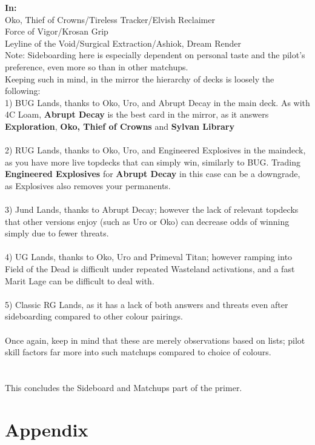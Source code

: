 \documentclass{report}
\begin{document}
\textbf{In:}\\
Oko, Thief of Crowns/Tireless Tracker/Elvish Reclaimer\\Force of Vigor/Krosan Grip\\Leyline of the Void/Surgical Extraction/Ashiok, Dream Render\\
Note: Sideboarding here is especially dependent on personal taste and the pilot's preference, even more so than in other matchups.\\
Keeping such in mind, in the mirror the hierarchy of decks is loosely the following:\\
1) BUG Lands, thanks to Oko, Uro, and Abrupt Decay in the main deck. As with 4C Loam, \textbf{Abrupt Decay} is the best card in the mirror, as it answers \textbf{Exploration}, \textbf{Oko, Thief of Crowns} and \textbf{Sylvan Library}\\\\
2) RUG Lands, thanks to Oko, Uro, and Engineered Explosives in the maindeck, as you have more live topdecks that can simply win, similarly to BUG. Trading \textbf{Engineered Explosives} for \textbf{Abrupt Decay} in this case can be a downgrade, as Explosives also removes your permanents.\\\\
3) Jund Lands, thanks to Abrupt Decay; however the lack of relevant topdecks that other versions enjoy (such as Uro or Oko) can decrease odds of winning simply due to fewer threats.\\\\
4) UG Lands, thanks to Oko, Uro and Primeval Titan; however ramping into Field of the Dead is difficult under repeated Wasteland activations, and a fast Marit Lage can be difficult to deal with.\\\\
5) Classic RG Lands, as it has a lack of both answers and threats even after sideboarding compared to other colour pairings. \\\\
Once again, keep in mind that these are merely observations based on lists; pilot skill factors far more into such matchups compared to choice of colours.\\\\\\
This concludes the Sideboard and Matchups part of the primer.\\
\chapter{Appendix}
\end{document}

